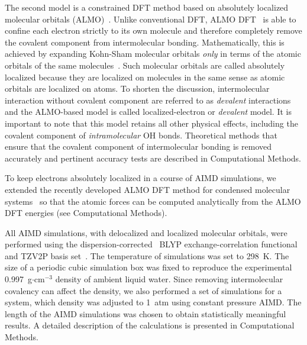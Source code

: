 \documentclass[aps,prl,reprint,amsmath,amssymb]{revtex4-1}
\begin{document}
The second model is a constrained DFT method based on absolutely localized molecular orbitals (ALMO)~\cite{khaliullin2006efficient}. 
Unlike conventional DFT, ALMO DFT~\cite{Khaliullin2013JCTC} is able to confine each electron strictly to its own molecule and therefore completely remove the covalent component from intermolecular bonding. 
Mathematically, this is achieved by expanding Kohn-Sham molecular orbitals \emph{only} in terms of the atomic orbitals of the same molecules~\cite{gian,khaliullin2006efficient, blw}. 
Such molecular orbitals are called absolutely localized because they are localized on molecules in the same sense as atomic orbitals are localized on atoms. 
To shorten the discussion, intermolecular interaction without covalent component are referred to as \emph{devalent} interactions and the ALMO-based model is called localized-electron or \emph{devalent} model. 
It is important to note that this model retains all other physical effects, including the covalent component of \emph{intramolecular} OH bonds. %
Theoretical methods that ensure that the covalent component of intermolecular bonding is removed accurately and pertinent accuracy tests are described in Computational Methods.

To keep electrons absolutely localized in a course of AIMD simulations, we extended the recently developed ALMO DFT method for  condensed molecular systems~\cite{Khaliullin2013JCTC} so that the atomic forces can be computed analytically from the ALMO DFT energies (see Computational Methods).

All AIMD simulations, with delocalized and localized molecular orbitals, were performed using the dispersion-corrected~\cite{grimme2010consistent} BLYP exchange-correlation functional~\cite{becke1988density, lee1988development} and TZV2P basis set~\cite{vandevondele2007gaussian}. 
The temperature of simulations was set to 298~K. 
The size of a periodic cubic simulation box was fixed to reproduce the experimental 0.997~g$\cdot$cm$^{-3}$ density of ambient liquid water. 
Since removing intermolecular covalency can affect the density, we also performed a set of simulations for a system, which density was adjusted to 1~atm using constant pressure AIMD. 
The length of the AIMD simulations was chosen to obtain statistically meaningful results. 
A detailed description of the calculations is presented in Computational Methods.
\end{document}
